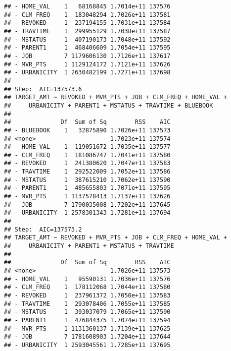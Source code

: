 \documentclass[]{article}
\begin{document}
\begin{verbatim}
## - HOME_VAL    1   68168845 1.7014e+11 137576
## - CLM_FREQ    1  183048294 1.7026e+11 137581
## - REVOKED     1  237194155 1.7031e+11 137584
## - TRAVTIME    1  299955129 1.7038e+11 137587
## - MSTATUS     1  407190173 1.7048e+11 137592
## - PARENT1     1  468406609 1.7054e+11 137595
## - JOB         7 1179606130 1.7126e+11 137617
## - MVR_PTS     1 1129124172 1.7121e+11 137626
## - URBANICITY  1 2630482199 1.7271e+11 137698
## 
## Step:  AIC=137573.6
## TARGET_AMT ~ REVOKED + MVR_PTS + JOB + CLM_FREQ + HOME_VAL + 
##     URBANICITY + PARENT1 + MSTATUS + TRAVTIME + BLUEBOOK
## 
##              Df  Sum of Sq        RSS    AIC
## - BLUEBOOK    1   32875890 1.7026e+11 137573
## <none>                     1.7023e+11 137574
## - HOME_VAL    1  119051672 1.7035e+11 137577
## - CLM_FREQ    1  181086747 1.7041e+11 137580
## - REVOKED     1  241380620 1.7047e+11 137583
## - TRAVTIME    1  292522009 1.7052e+11 137586
## - MSTATUS     1  387615210 1.7062e+11 137590
## - PARENT1     1  485655803 1.7071e+11 137595
## - MVR_PTS     1 1137578413 1.7137e+11 137626
## - JOB         7 1790035008 1.7202e+11 137645
## - URBANICITY  1 2578301343 1.7281e+11 137694
## 
## Step:  AIC=137573.2
## TARGET_AMT ~ REVOKED + MVR_PTS + JOB + CLM_FREQ + HOME_VAL + 
##     URBANICITY + PARENT1 + MSTATUS + TRAVTIME
## 
##              Df  Sum of Sq        RSS    AIC
## <none>                     1.7026e+11 137573
## - HOME_VAL    1   95590131 1.7036e+11 137576
## - CLM_FREQ    1  178112068 1.7044e+11 137580
## - REVOKED     1  237961372 1.7050e+11 137583
## - TRAVTIME    1  293078406 1.7055e+11 137585
## - MSTATUS     1  393037079 1.7065e+11 137590
## - PARENT1     1  476844375 1.7074e+11 137594
## - MVR_PTS     1 1131360137 1.7139e+11 137625
## - JOB         7 1781608903 1.7204e+11 137644
## - URBANICITY  1 2593045561 1.7285e+11 137695
\end{verbatim}
\end{document}
